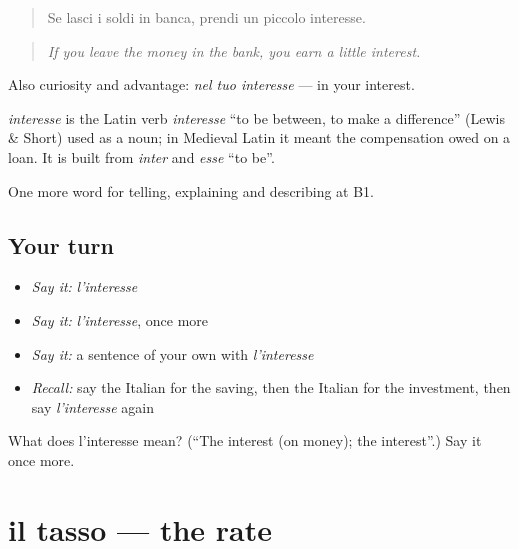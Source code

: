 \begin{quote}
Se lasci i soldi in banca, prendi un piccolo interesse.
\end{quote}

\begin{quote}
\emph{If you leave the money in the bank, you earn a little interest.}
\end{quote}

Also curiosity and advantage: \emph{nel tuo interesse} — in your interest.

\begin{cousinweb}
\emph{interesse} is the Latin verb \emph{interesse} \textquotedblleft{}to be between, to make a difference\textquotedblright{} (Lewis \& Short) used as a noun; in Medieval Latin it meant the compensation owed on a loan. It is built from \emph{inter} and \emph{esse} \textquotedblleft{}to be\textquotedblright{}.
\end{cousinweb}

\begin{grammarlens}[title={What you've built}]
One more word for telling, explaining and describing at B1.
\end{grammarlens}

\subsection*{Your turn}
\begin{itemize}
\raggedright
  \item \emph{Say it:} \emph{l'interesse}
  \item \emph{Say it:} \emph{l'interesse}, once more
  \item \emph{Say it:} a sentence of your own with \emph{l'interesse}
  \item \emph{Recall:} say the Italian for the saving, then the Italian for the investment, then say \emph{l'interesse} again
\end{itemize}

\begin{tcolorbox}[breakable,colback=teal!4,colframe=teal!35!black,title={Before you move on}]
What does l'interesse mean? (\textquotedblleft{}The interest (on money); the interest\textquotedblright{}.) Say it once more.
\end{tcolorbox}
\section[il tasso]{il tasso — the rate}

